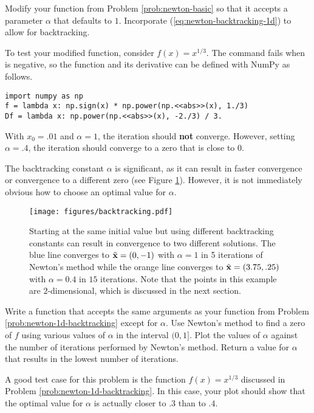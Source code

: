 \begin{problem} %
Modify your function from Problem \ref{prob:newton-basic} so that it accepts a parameter $\alpha$ that defaults to $1$.
Incorporate (\ref{eq:newton-backtracking-1d}) to allow for backtracking.

To test your modified function, consider $f(x)=x^{1/3}$.
The command  fails when  is negative, so the function and its derivative can be defined with NumPy as follows.
\begin{lstlisting}
import numpy as np
f = lambda x: np.sign(x) * np.power(np.<<abs>>(x), 1./3)
Df = lambda x: np.power(np.<<abs>>(x), -2./3) / 3.
\end{lstlisting}
With $x_0=.01$ and $\alpha=1$, the iteration should \textbf{not} converge.
However, setting $\alpha=.4$, the iteration should converge to a zero that is close to $0$.
\label{prob:newton-1d-backtracking}
\end{problem}

The backtracking constant $\alpha$ is significant, as it can result in faster convergence or convergence to a different zero (see Figure \ref{fig:newton-backtracking-multi-result}).
However, it is not immediately obvious how to choose an optimal value for $\alpha$.

\begin{figure}[H]
\centering
\texttt{[image: figures/backtracking.pdf]}
\caption{Starting at the same initial value but using different backtracking constants can result in convergence to two different solutions.
The blue line converges to $\tilde{\mathbf{x}} = (0,-1)$ with $\alpha = 1$ in 5 iterations of Newton's method while the orange line converges to $\hat{\mathbf{x}} = (3.75,.25)$ with $\alpha = 0.4$ in $15$ iterations.
Note that the points in this example are $2$-dimensional, which is discussed in the next section.}
\label{fig:newton-backtracking-multi-result}
\end{figure}

\begin{problem} %
\label{prob:newton-backtracking-search}
Write a function that accepts the same arguments as your function from Problem \ref{prob:newton-1d-backtracking} except for $\alpha$.
Use Newton's method to find a zero of $f$ using various values of $\alpha$ in the interval $(0,1]$.
Plot the values of $\alpha$ against the number of iterations performed by Newton's method.
Return a value for $\alpha$ that results in the lowest number of iterations.

A good test case for this problem is the function $f(x) = x^{1/3}$ discussed in Problem \ref{prob:newton-1d-backtracking}.
In this case, your plot should show that the optimal value for $\alpha$ is actually closer to $.3$ than to $.4$.
\end{problem}

